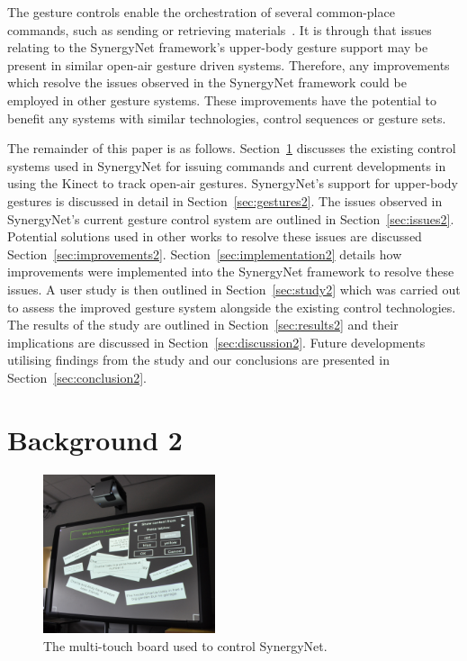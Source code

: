 \documentclass[manuscript, review, screen]{acmart}
\begin{document}
The gesture controls enable the orchestration of several common-place commands, such as sending or retrieving materials~\cite{mcnaughton-et-al:jce2017}.
It is through that issues relating to the SynergyNet framework's upper-body gesture support may be present in similar open-air gesture driven systems.
Therefore, any improvements which resolve the issues observed in the SynergyNet framework could be employed in other gesture systems. 
These improvements have the potential to benefit any systems with similar technologies, control sequences or gesture sets.

The remainder of this paper is as follows. 
Section~\ref{sec:related2} discusses the existing control systems used in SynergyNet for issuing commands and current developments in using the Kinect to track open-air gestures.
SynergyNet's support for upper-body gestures is discussed in detail in Section~\ref{sec:gestures2}.
The issues observed in SynergyNet's current gesture control system are outlined in Section~\ref{sec:issues2}.
Potential solutions used in other works to resolve these issues are discussed Section~\ref{sec:improvements2}.
Section~\ref{sec:implementation2} details how improvements were implemented into the SynergyNet framework to resolve these issues.
A user study is then outlined in Section~\ref{sec:study2} which was carried out to assess the improved gesture system alongside the existing control technologies.
The results of the study are outlined in Section~\ref{sec:results2} and their implications are discussed in Section~\ref{sec:discussion2}.
Future developments utilising findings from the study and our conclusions are presented in Section~\ref{sec:conclusion2}.


\section{Background 2} 
\label{sec:related2}


\begin{figure}[h]
   \centering
   \includegraphics[width=0.45\textwidth]{figures/new_control_board.png}
   \caption{The multi-touch board used to control SynergyNet.}
   \label{fig:controlBoard}
\end{figure}
\end{document}
